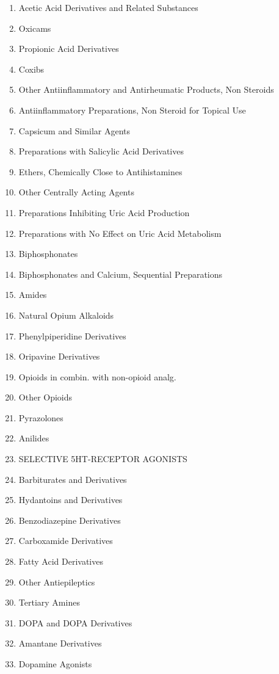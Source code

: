 \documentclass[a4paper,12pt]{article}
\begin{document}
\begin{appendices}
\begin{enumerate}
   			\item Acetic Acid Derivatives and Related Substances
   			\item Oxicams
   			\item Propionic Acid Derivatives
   			\item Coxibs
   			\item Other Antiinflammatory and Antirheumatic Products, Non Steroids
   			\item Antiinflammatory Preparations, Non Steroid for Topical Use
   			\item Capsicum and Similar Agents
   			\item Preparations with Salicylic Acid Derivatives
   			\item Ethers, Chemically Close to Antihistamines
   			\item Other Centrally Acting Agents
   			\item Preparations Inhibiting Uric Acid Production
   			\item Preparations with No Effect on Uric Acid Metabolism
   			\item Biphosphonates
   			\item Biphosphonates and Calcium, Sequential Preparations
   			\item Amides
   			\item Natural Opium Alkaloids
   			\item Phenylpiperidine Derivatives
   			\item Oripavine Derivatives
   			\item Opioids in combin. with non-opioid analg.
   			\item Other Opioids
   			\item Pyrazolones
   			\item Anilides
   			\item SELECTIVE 5HT-RECEPTOR AGONISTS
   			\item Barbiturates and Derivatives
   			\item Hydantoins and Derivatives
   			\item Benzodiazepine Derivatives
   			\item Carboxamide Derivatives
   			\item Fatty Acid Derivatives
   			\item Other Antiepileptics
   			\item Tertiary Amines
   			\item DOPA and DOPA Derivatives
   			\item Amantane Derivatives
   			\item Dopamine Agonists

\end{enumerate}
\end{appendices}
\end{document}
